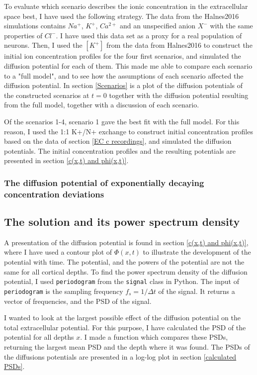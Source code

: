 \documentclass{article}
\begin{document}
To evaluate which scenario describes the ionic concentration in the extracellular space best, I have used the following strategy. 
The data from the Halnes2016 simulations \cite{Halnes2016} contains $Na^+$, $K^+$, $Ca^{2+}$ and an unspecified anion $X^-$ with the same properties of $Cl^-$. I have used this data set as a proxy for a real population of neurons. Then, I used the $[K^+]$ from the data from Halnes2016 to construct the initial ion concentration profiles for the four first scenarios, and simulated the diffusion potential for each of them. This made me able to compare each scenario to a "full model", and to see how the assumptions of each scenario affected the diffusion potential. In section \ref{Scenarios} is a plot of the diffusion potentials of the constructed scenarios at $t=0$ together with the diffusion potential resulting from the full model, together with a discussion of each scenario. 

Of the scenarios 1-4, scenario 1 gave the best fit with the full model. For this reason, I used the 1:1 K+/N+ exchange to construct initial concentration profiles based on the data of section \ref{EC c recordings}, and simulated the diffusion potentials. The  initial concentration profiles and the resulting potentials are presented in section \ref{c(x,t) and phi(x,t)}.
\subsubsection{The diffusion potential of exponentially decaying concentration deviations}
\subsection{The solution and its power spectrum density}\label{PSD of solution}
A presentation of the diffusion potential is found in section \ref{c(x,t) and phi(x,t)}, where I have used a contour plot of $\Phi(x,t)$ to illustrate the development of the potential with time. The potential, and the powers of the potential are not the same for all cortical depths.
To find the power spectrum density of the diffusion potential, I used \texttt{periodogram}  from the \texttt{signal} class in Python. The input of \texttt{periodogram} is the sampling frequency $f_s = 1/\Delta t$ of the signal. It returns a vector of frequencies, and the PSD of the signal.

 I wanted to look at the largest possible effect of the diffusion potential on the total extracellular potential. For this purpose, I have calculated the PSD of the potential for all depths $x$. I made a function which compares these PSDs, returning the largest mean PSD and the depth where it was found. The PSDs of the diffusions potentials are presented in a log-log plot in section \ref{calculated PSDs}. 
\end{document}
